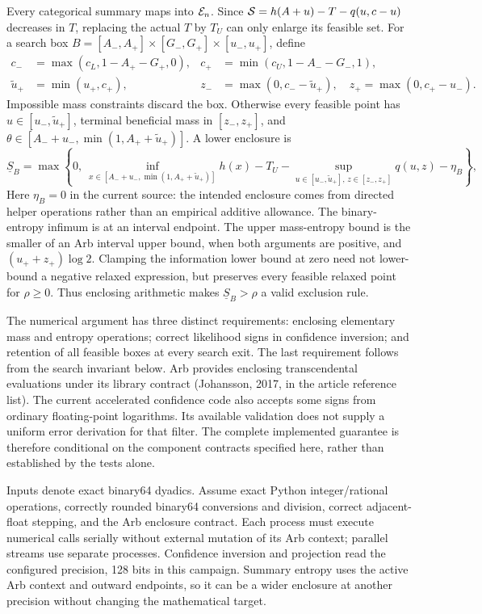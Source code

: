 \documentclass[10pt]{article}
\begin{document}
Every categorical summary maps into $\mathcal E_n$. Since $\mathcal S=h(A+u)-T-q(u,c-u)$ decreases in $T$, replacing the actual $T$ by $T_U$ can only enlarge its feasible set. For a search box $B=[A_-,A_+]\times[G_-,G_+]\times[u_-,u_+]$, define
\begin{align}
 c_-&=\max(c_L,1-A_+-G_+,0),&c_+&=\min(c_U,1-A_--G_-,1),\\
 \tilde u_+&=\min(u_+,c_+),&
 z_-&=\max(0,c_--\tilde u_+),\quad z_+=\max(0,c_+-u_-).
\end{align}
Impossible mass constraints discard the box. Otherwise every feasible point has $u\in[u_-,\tilde u_+]$, terminal beneficial mass in $[z_-,z_+]$, and $\theta\in[A_-+u_-,\min(1,A_++\tilde u_+)]$. A lower enclosure is
\begin{equation}
 \underline S_B=\max\left\{0,\ \inf_{x\in[A_-+u_-,\min(1,A_++\tilde u_+)]}h(x)
       -T_U-\sup_{u\in[u_-,\tilde u_+],\,z\in[z_-,z_+]}q(u,z)-\eta_B\right\},
\end{equation}
Here $\eta_B=0$ in the current source: the intended enclosure comes from directed helper operations rather than an empirical additive allowance. The binary-entropy infimum is at an interval endpoint. The upper mass-entropy bound is the smaller of an Arb interval upper bound, when both arguments are positive, and $(u_++z_+)\log2$. Clamping the information lower bound at zero need not lower-bound a negative relaxed expression, but preserves every feasible relaxed point for $\rho\ge0$. Thus enclosing arithmetic makes $\underline S_B>\rho$ a valid exclusion rule.

The numerical argument has three distinct requirements: enclosing elementary mass and entropy operations; correct likelihood signs in confidence inversion; and retention of all feasible boxes at every search exit. The last requirement follows from the search invariant below. Arb provides enclosing transcendental evaluations under its library contract (Johansson, 2017, in the article reference list). The current accelerated confidence code also accepts some signs from ordinary floating-point logarithms. Its available validation does not supply a uniform error derivation for that filter. The complete implemented guarantee is therefore conditional on the component contracts specified here, rather than established by the tests alone.

Inputs denote exact binary64 dyadics. Assume exact Python integer/rational operations, correctly rounded binary64 conversions and division, correct adjacent-float stepping, and the Arb enclosure contract. Each process must execute numerical calls serially without external mutation of its Arb context; parallel streams use separate processes. Confidence inversion and projection read the configured precision, 128 bits in this campaign. Summary entropy uses the active Arb context and outward endpoints, so it can be a wider enclosure at another precision without changing the mathematical target.
\end{document}
